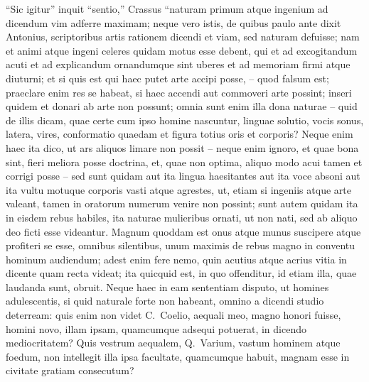 ``Sic igitur'' inquit ``sentio,'' Crassus ``naturam primum atque ingenium ad dicendum vim adferre maximam; neque vero istis, de quibus paulo ante dixit Antonius, scriptoribus artis rationem dicendi et viam, sed naturam defuisse; nam et animi atque ingeni celeres quidam motus esse debent, qui et ad excogitandum acuti et ad explicandum ornandumque sint uberes et ad memoriam firmi atque diuturni; et si quis est qui haec putet arte accipi posse, – quod falsum est; praeclare enim res se habeat, si haec accendi aut commoveri arte possint; inseri quidem et donari ab arte non possunt; omnia sunt enim illa dona naturae – quid de illis dicam, quae certe cum ipso homine nascuntur, linguae solutio, vocis sonus, latera, vires, conformatio quaedam et figura totius oris et corporis? Neque enim haec ita dico, ut ars aliquos limare non possit – neque enim ignoro, et quae bona sint, fieri meliora posse doctrina, et, quae non optima, aliquo modo acui tamen et corrigi posse – sed sunt quidam aut ita lingua haesitantes aut ita voce absoni aut ita vultu motuque corporis vasti atque agrestes, ut, etiam si ingeniis atque arte valeant, tamen in oratorum numerum venire non possint; sunt autem quidam ita in eisdem rebus habiles, ita naturae mulieribus ornati, ut non nati, sed ab aliquo deo ficti esse videantur. Magnum quoddam est onus atque munus suscipere atque profiteri se esse, omnibus silentibus, unum maximis de rebus magno in conventu hominum audiendum; adest enim fere nemo, quin acutius atque acrius vitia in dicente quam recta videat; ita quicquid est, in quo offenditur, id etiam illa, quae laudanda sunt, obruit.  Neque haec in eam sententiam disputo, ut homines adulescentis, si quid naturale forte non habeant, omnino a dicendi studio deterream: quis enim non videt C.~Coelio, aequali meo, magno honori fuisse, homini novo, illam ipsam, quamcumque adsequi potuerat, in dicendo mediocritatem? Quis vestrum aequalem, Q.~Varium, vastum hominem atque foedum, non intellegit illa ipsa facultate, quamcumque habuit, magnam esse in civitate gratiam consecutum?

